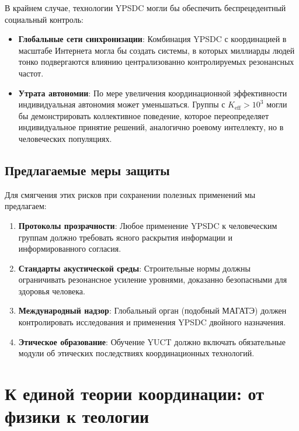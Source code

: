 \documentclass[12pt,a4paper]{article}
\begin{document}
	В крайнем случае, технологии YPSDC могли бы обеспечить беспрецедентный социальный контроль:
	
	\begin{itemize}
		\item \textbf{Глобальные сети синхронизации}: Комбинация YPSDC с координацией в масштабе Интернета могла бы создать системы, в которых миллиарды людей тонко подвергаются влиянию централизованно контролируемых резонансных частот.
		
		\item \textbf{Утрата автономии}: По мере увеличения координационной эффективности индивидуальная автономия может уменьшаться. Группы с $K_{\mathrm{eff}} > 10^3$ могли бы демонстрировать коллективное поведение, которое переопределяет индивидуальное принятие решений, аналогично роевому интеллекту, но в человеческих популяциях.
	\end{itemize}
	
	\subsection{Предлагаемые меры защиты}
	
	Для смягчения этих рисков при сохранении полезных применений мы предлагаем:
	
	\begin{enumerate}
		\item \textbf{Протоколы прозрачности}: Любое применение YPSDC к человеческим группам должно требовать ясного раскрытия информации и информированного согласия.
		
		\item \textbf{Стандарты акустической среды}: Строительные нормы должны ограничивать резонансное усиление уровнями, доказанно безопасными для здоровья человека.
		
		\item \textbf{Международный надзор}: Глобальный орган (подобный МАГАТЭ) должен контролировать исследования и применения YPSDC двойного назначения.
		
		\item \textbf{Этическое образование}: Обучение YUCT должно включать обязательные модули об этических последствиях координационных технологий.
	\end{enumerate}
	
	\section{К единой теории координации: от физики к теологии}
	\label{sec:philosophy}
	
\end{document}
